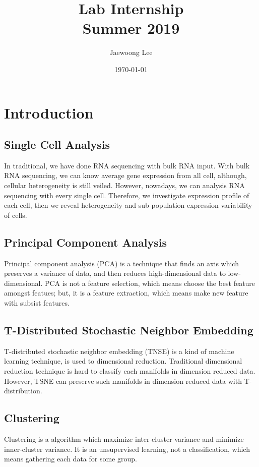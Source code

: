 \documentclass[aps, 10pt, a4paper]{article}
\title{Lab Internship\\Summer 2019}
\author{Jaewoong Lee}
\date{\today}
\begin{document}
    \maketitle
    \newpage
    
    \tableofcontents
    \listoftables
    \listoffigures
    \listoflistings
    \newpage
    
    \section{Introduction}
        \subsection{Single Cell Analysis}
            In traditional, we have done RNA sequencing with bulk RNA input. With bulk RNA sequencing, we can know average gene expression from all cell, although, cellular heterogeneity is still veiled. 
            However, nowadays, we can analysis RNA sequencing with every single cell. Therefore, we investigate expression profile of each cell, then we reveal heterogeneity and sub-population expression variability of cells.
        
        \subsection{Principal Component Analysis}
            Principal component analysis (PCA) is a technique that finds an axis which preserves a variance of data, and then reduces high-dimensional data to low-dimensional. PCA is not a feature selection, which means choose the best feature amongst featues; but, it is a feature extraction, which means make new feature with subsist features.
        
        \subsection{T-Distributed Stochastic Neighbor Embedding}
            T-distributed stochastic neighbor embedding (TNSE) is a kind of machine learning technique, is used to dimensional reduction. Traditional dimensional reduction technique is hard to classify each manifolds in dimension reduced data. However, TSNE can preserve such manifolds in dimension reduced data with T-distribution. 
        
        \subsection{Clustering}
            Clustering is a algorithm which maximize inter-cluster variance and minimize inner-cluster variance. It is an unsupervised learning, not a classification, which means gathering each data for some group.
    
\end{document}

